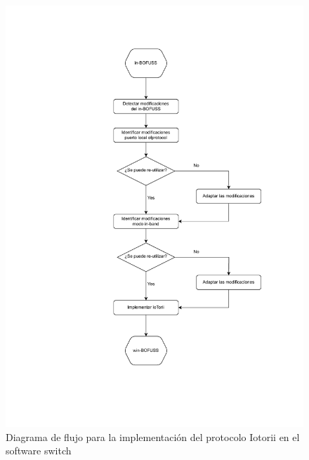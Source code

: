 \begin{figure}[ht]
    \centering
    \includegraphics[width=\textwidth]{archivos/img/dev/WIN-BOFUSS.drawio.pdf}
    \caption{Diagrama de flujo para la implementación del protocolo Iotorii en el software switch }
    \label{fig:WIN-BOFUSS}
\end{figure}


